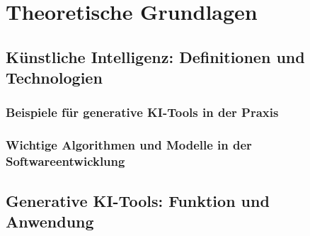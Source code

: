 \chapter{Theoretische Grundlagen}

\section{Künstliche Intelligenz: Definitionen und Technologien}


\subsection{Beispiele für generative KI-Tools in der Praxis}


\subsection{Wichtige Algorithmen und Modelle in der Softwareentwicklung}


\section{Generative KI-Tools: Funktion und Anwendung}


